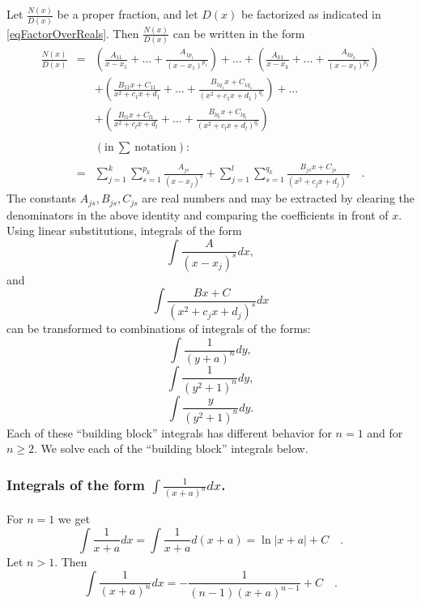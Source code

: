 \documentclass[12pt]{book}
\begin{document}
Let $\frac{N(x)}{D(x)}$ be a proper fraction, and let $D(x)$ be factorized as indicated in \eqref{eqFactorOverReals}. Then $\frac{N(x)}{D(x)}$ can be written in the form
\begin{equation}\label{eqSplitPF}
\begin{array}{rcl}
\displaystyle\frac{N(x)}{D(x)}&=&\displaystyle \left (\frac{A_{11}}{x-x_1}+\dots +\frac{A_{1p_1}}{(x-x_1)^{p_1}}\right) +\dots + \left (\frac{A_{k1}}{x-x_k}+\dots +\frac{A_{kp_k}}{(x-x_1)^{p_k}}\right) \\
&&\displaystyle+\left(\frac {B_{11}x+C_{11}}{x^2+c_1x+d_1}+\dots +\frac {B_{1q_1}x+C_{1q_1}}{(x^2+c_1x+d_1)^{q_1}} \right)+\dots 
\\&&\displaystyle +
\left(\frac {B_{l1}x+C_{l1}}{x^2+c_lx+d_l}+\dots +\frac {B_{lq_l}x+C_{lq_l}}{(x^2+c_lx+d_l)^{q_l}} \right)\\ \\
&&(\mathrm{in~}\sum\mathrm{~notation}):\\ \\
&=&\displaystyle \sum_{j=1}^{k}\sum_{s=1}^{p_k} \frac{A_{js}}{(x-x_j)^s}+\sum_{j=1}^{l}\sum_{s=1}^{q_k} \frac{B_{js}x+C_{js}}{(x^2+c_jx+d_j)^s}\quad .
\end{array}
\end{equation}
The constants $A_{js}, B_{js}, C_{js}$ are real numbers and may be extracted by clearing the denominators in the above identity and comparing the coefficients in front of $x$.
Using linear substitutions, integrals of the form 
\[\displaystyle\int \frac{A}{(x-x_j)^s}dx,
\] 
and
\[
\int \frac{Bx+C}{(x^2+c_jx+d_j)^s}dx
\] 
can be transformed to combinations of integrals of the forms: 
\[
\int \frac{1}{(y+a)^n}dy,
\]  
\[
\int \frac{1}{(y^2+1)^n}dy,
\] 
\[\int \frac{y}{(y^2+1)^n}dy.
\] 
Each of these ``building block'' integrals has different behavior for $n=1$ and for $n\geq 2$. We solve each of the ``building block'' integrals below. 

\subsubsection{Integrals of the form $\displaystyle\int \frac{1}{(x+a)^n}dx$.}
For $n=1$ we get
\begin{equation}\label{eqBuildingBlockInt1base}
\int \frac{1}{x+a}dx=\int {\frac{1}{x+a}d(x+a)}= \ln |x+a| +C\quad .
\end{equation}
Let $n> 1$. Then
\begin{equation}\label{eqBuildingBlockInt1N}
\int \frac{1}{(x+a)^n}dx= -\frac{1}{(n-1)(x+a)^{n-1}}+C \quad .
\end{equation}
\end{document}
